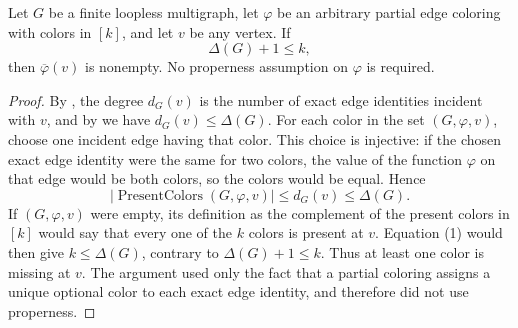 \begin{lemma}
Let \(G\) be a finite loopless multigraph, let \(\varphi\) be an arbitrary
partial edge coloring with colors in \([k]\), and let \(v\) be any vertex.
If
\[
                     \Delta(G)+1\leq k,
\]
then \(\overline\varphi(v)\) is nonempty.  No properness assumption on
\(\varphi\) is required.
\end{lemma}
\begin{proof}
By , the degree \(d_G(v)\) is the number of exact edge
identities incident with \(v\), and by  we have
\(d_G(v)\leq\Delta(G)\).  For each color in the set
\((G,\varphi,v)\), choose one incident edge having
that color.  This choice is injective: if the chosen exact edge identity
were the same for two colors, the value of the function \(\varphi\) on
that edge would be both colors, so the colors would be equal.  Hence
\[
 |\operatorname{PresentColors}(G,\varphi,v)|
       \leq d_G(v)\leq\Delta(G).                              \tag{1}
\]
If \((G,\varphi,v)\) were empty, its definition as
the complement of the present colors in \([k]\) would say that every one
of the \(k\) colors is present at \(v\).  Equation (1) would then give
\(k\leq\Delta(G)\), contrary to
\(\Delta(G)+1\leq k\).  Thus at least one color is missing at \(v\).
The argument used only the fact that a partial coloring assigns a unique
optional color to each exact edge identity, and therefore did not use
properness.
\end{proof}
